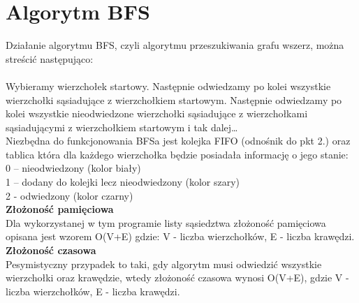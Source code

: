 \documentclass{article}
\begin{document}
\section{Algorytm BFS}
Działanie algorytmu BFS, czyli algorytmu przeszukiwania grafu wszerz, można streścić następująco: \\ \\
Wybieramy wierzchołek startowy. Następnie odwiedzamy po kolei wszystkie wierzchołki sąsiadujące z wierzchołkiem startowym. Następnie odwiedzamy po kolei wszystkie nieodwiedzone wierzchołki sąsiadujące z wierzchołkami sąsiadującymi z wierzchołkiem startowym i tak dalej…\\
Niezbędna do funkcjonowania BFSa jest kolejka FIFO (odnośnik do pkt 2.) oraz tablica która dla każdego wierzchołka będzie posiadała informację o jego stanie: \\

0  – nieodwiedzony (kolor biały) \\
1 – dodany do kolejki lecz nieodwiedzony (kolor szary) \\
2  - odwiedzony (kolor czarny) \\

\textbf{Złożoność pamięciowa}
 \\Dla wykorzystanej w tym programie listy sąsiedztwa złożoność pamięciowa opisana jest wzorem O(V+E) gdzie: V - liczba wierzchołków, E - liczba krawędzi.\\

\textbf{Złożoność czasowa}
\\Pesymistyczny przypadek to taki, gdy algorytm musi odwiedzić wszystkie wierzchołki oraz krawędzie, wtedy złożoność czasowa wynosi O(V+E), gdzie V - liczba wierzchołków, E - liczba krawędzi.
\end{document}
